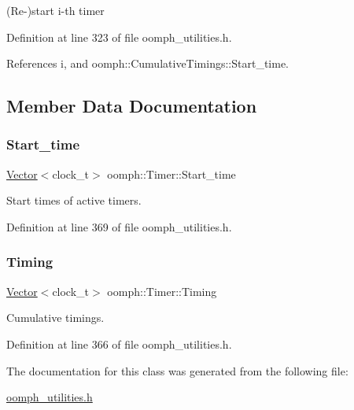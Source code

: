 (Re-\/)start i-\/th timer 



Definition at line 323 of file oomph\+\_\+utilities.\+h.



References i, and oomph\+::\+Cumulative\+Timings\+::\+Start\+\_\+time.



\subsection{Member Data Documentation}
\mbox{\label{classoomph_1_1Timer_ab3e1287373e9c5ae81731dd57c5db66f}} 
\subsubsection{\texorpdfstring{Start\+\_\+time}{Start\_time}}
{\footnotesize\ttfamily \hyperlink{classoomph_1_1Vector}{Vector}$<$clock\+\_\+t$>$ oomph\+::\+Timer\+::\+Start\+\_\+time\hspace{0.3cm}{\ttfamily [private]}}



Start times of active timers. 



Definition at line 369 of file oomph\+\_\+utilities.\+h.

\mbox{\label{classoomph_1_1Timer_a66035221f55db1dc65b8fb89ed0c831d}} 
\subsubsection{\texorpdfstring{Timing}{Timing}}
{\footnotesize\ttfamily \hyperlink{classoomph_1_1Vector}{Vector}$<$clock\+\_\+t$>$ oomph\+::\+Timer\+::\+Timing\hspace{0.3cm}{\ttfamily [private]}}



Cumulative timings. 



Definition at line 366 of file oomph\+\_\+utilities.\+h.



The documentation for this class was generated from the following file\+:\begin{DoxyCompactItemize}
\item 
\hyperlink{oomph__utilities_8h}{oomph\+\_\+utilities.\+h}\end{DoxyCompactItemize}
